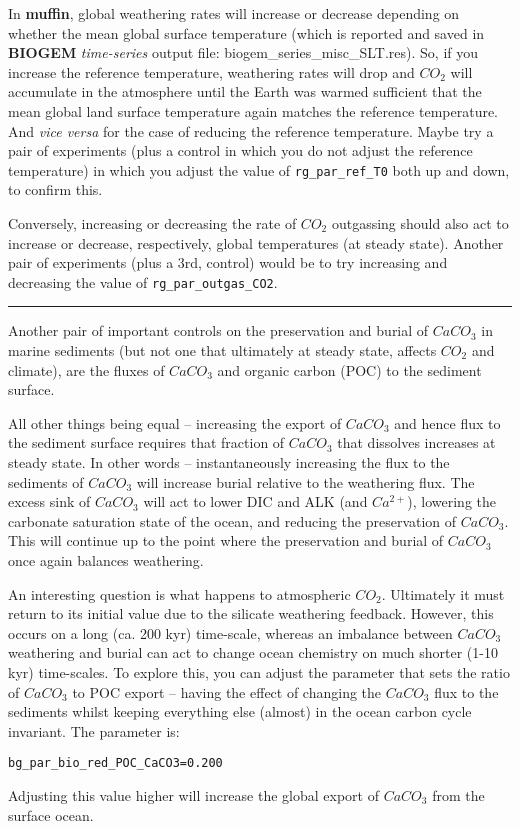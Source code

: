 \documentclass[11pt,fleqn]{book} %
\begin{document}
In \textbf{muffin}, global weathering rates will increase or decrease depending on whether the mean global surface temperature (which is reported and saved in \textbf{BIOGEM} \textit{time-series} output file: \textsf{\footnotesize biogem\_series\_misc\_SLT.res}). So, if you increase the reference temperature, weathering rates will drop and \(CO_{2}\) will accumulate in the atmosphere until the Earth was warmed sufficient that the mean global land surface temperature again matches the reference temperature. And \textit{vice versa} for the case of reducing the reference temperature. Maybe try a pair of experiments (plus a control in which you do not adjust the reference temperature) in which you adjust the value of \texttt{rg\_par\_ref\_T0} both up and down, to confirm this.

Conversely, increasing or decreasing the rate of \(CO_{2}\) outgassing should also act to increase or decrease, respectively, global temperatures (at steady state). Another pair of experiments (plus a 3rd, control) would be to try increasing and decreasing the value of \texttt{rg\_par\_outgas\_CO2}.

\vspace{1mm}
\noindent\rule{4cm}{0.1mm}
\vspace{2mm}

\noindent Another pair of important controls on the preservation and burial of \(CaCO_{3}\) in marine sediments (but not one that ultimately at steady state, affects \(CO_{2}\) and climate), are the fluxes of \(CaCO_{3}\) and  organic carbon (POC) to the sediment surface.

All other things being equal -- increasing the export of \(CaCO_{3}\) and hence flux to the sediment surface requires that fraction of \(CaCO_{3}\) that dissolves increases at steady state. In other words -- instantaneously increasing the flux to the sediments of \(CaCO_{3}\) will increase burial relative to the weathering flux. The excess sink of \(CaCO_{3}\) will act to lower DIC and ALK (and \(Ca^{2+}\)), lowering the carbonate saturation state of the ocean, and reducing the preservation of \(CaCO_{3}\). This will continue up to the point where the preservation and burial of \(CaCO_{3}\) once again balances weathering.

An interesting question is what happens to atmospheric \(CO_{2}\). Ultimately it must return to its initial value due to the silicate weathering feedback. However, this occurs on a long (ca. 200 kyr) time-scale, whereas an imbalance between \(CaCO_{3}\) weathering and burial can act to change ocean chemistry on much shorter (1-10 kyr) time-scales. To explore this, you can adjust the parameter that sets the ratio of \(CaCO_{3}\) to POC export -- having the effect of changing the \(CaCO_{3}\) flux to the sediments whilst keeping everything else (almost) in the ocean carbon cycle invariant. The parameter is:
\vspace{-1mm}\small\begin{verbatim}
bg_par_bio_red_POC_CaCO3=0.200
\end{verbatim}\normalsize\vspace{-1mm}
Adjusting this value higher will increase the global export of \(CaCO_{3}\) from the surface ocean.
\end{document}

